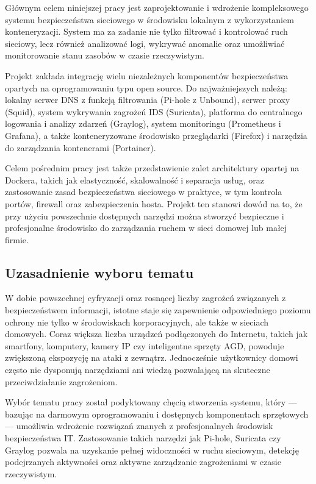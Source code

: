 \documentclass[
    left=2.5cm,         %
    right=2.5cm,        %
    top=2.5cm,          %
    bottom=3cm,         %
    bindingoffset=6mm,  %
    nohyphenation=true %
]{eiti/eiti-thesis} %
\begin{document}
Głównym celem niniejszej pracy jest zaprojektowanie i wdrożenie kompleksowego systemu bezpieczeństwa sieciowego w środowisku lokalnym z wykorzystaniem konteneryzacji. System ma za zadanie nie tylko filtrować i kontrolować ruch sieciowy, lecz również analizować logi, wykrywać anomalie oraz umożliwiać monitorowanie stanu zasobów w czasie rzeczywistym.

Projekt zakłada integrację wielu niezależnych komponentów bezpieczeństwa opartych na oprogramowaniu typu open source. Do najważniejszych należą: lokalny serwer DNS z funkcją filtrowania (Pi-hole z Unbound), serwer proxy (Squid), system wykrywania zagrożeń IDS (Suricata), platforma do centralnego logowania i analizy zdarzeń (Graylog), system monitoringu (Prometheus i Grafana), a także konteneryzowane środowisko przeglądarki (Firefox) i narzędzia do zarządzania kontenerami (Portainer).

Celem pośrednim pracy jest także przedstawienie zalet architektury opartej na Dockera, takich jak elastyczność, skalowalność i separacja usług, oraz zastosowanie zasad bezpieczeństwa sieciowego w praktyce, w tym kontrola portów, firewall oraz zabezpieczenia hosta. Projekt ten stanowi dowód na to, że przy użyciu powszechnie dostępnych narzędzi można stworzyć bezpieczne i profesjonalne środowisko do zarządzania ruchem w sieci domowej lub małej firmie.

\subsection{Uzasadnienie wyboru tematu}

W dobie powszechnej cyfryzacji oraz rosnącej liczby zagrożeń związanych z bezpieczeństwem informacji, istotne staje się zapewnienie odpowiedniego poziomu ochrony nie tylko w środowiskach korporacyjnych, ale także w sieciach domowych. Coraz większa liczba urządzeń podłączonych do Internetu, takich jak smartfony, komputery, kamery IP czy inteligentne sprzęty AGD, powoduje zwiększoną ekspozycję na ataki z zewnątrz. Jednocześnie użytkownicy domowi często nie dysponują narzędziami ani wiedzą pozwalającą na skuteczne przeciwdziałanie zagrożeniom.

Wybór tematu pracy został podyktowany chęcią stworzenia systemu, który — bazując na darmowym oprogramowaniu i dostępnych komponentach sprzętowych — umożliwia wdrożenie rozwiązań znanych z profesjonalnych środowisk bezpieczeństwa IT. Zastosowanie takich narzędzi jak Pi-hole, Suricata czy Graylog pozwala na uzyskanie pełnej widoczności w ruchu sieciowym, detekcję podejrzanych aktywności oraz aktywne zarządzanie zagrożeniami w czasie rzeczywistym.
\end{document}
